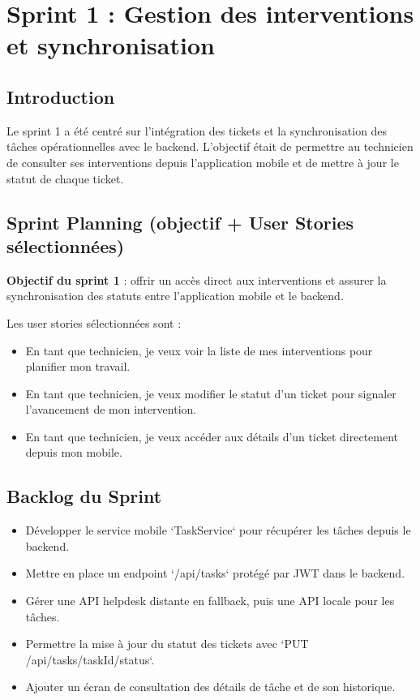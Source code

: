 \documentclass[12pt,a4paper]{report}
\begin{document}
\chapter{Sprint 1 : Gestion des interventions et synchronisation}

\section{Introduction}
\noindent Le sprint 1 a été centré sur l'intégration des tickets et la synchronisation des tâches opérationnelles avec le backend. L'objectif était de permettre au technicien de consulter ses interventions depuis l'application mobile et de mettre à jour le statut de chaque ticket.

\section{Sprint Planning (objectif + User Stories sélectionnées)}
\noindent \textbf{Objectif du sprint 1} : offrir un accès direct aux interventions et assurer la synchronisation des statuts entre l'application mobile et le backend.

\noindent Les user stories sélectionnées sont :
\begin{itemize}
    \item En tant que technicien, je veux voir la liste de mes interventions pour planifier mon travail.
    \item En tant que technicien, je veux modifier le statut d'un ticket pour signaler l'avancement de mon intervention.
    \item En tant que technicien, je veux accéder aux détails d'un ticket directement depuis mon mobile.
\end{itemize}

\section{Backlog du Sprint}
\begin{itemize}
    \item Développer le service mobile `TaskService` pour récupérer les tâches depuis le backend.
    \item Mettre en place un endpoint `/api/tasks` protégé par JWT dans le backend.
    \item Gérer une API helpdesk distante en fallback, puis une API locale pour les tâches.
    \item Permettre la mise à jour du statut des tickets avec `PUT /api/tasks/{taskId}/status`.
    \item Ajouter un écran de consultation des détails de tâche et de son historique.
\end{itemize}
\end{document}
